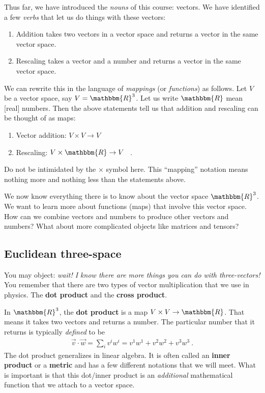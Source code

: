 \documentclass[12pt]{article}
\begin{document}
Thus far, we have introduced the \emph{nouns} of this course: vectors. We have identified a few \emph{verbs} that let us do things with these vectors:
\begin{enumerate}
    \item Addition takes two vectors in a vector space and returns a vector in the same vector space. 
    \item Rescaling takes a vector and a number and returns a vector in the same vector space.
\end{enumerate}
We can rewrite this in the language of \emph{mappings} (or \emph{functions}) as follows. Let $V$ be a vector space, say $V=\mathbbm{R}^3$. Let us write $\mathbbm{R}$ mean [real] numbers. Then the above statements tell us that addition and rescaling can be thought of as maps:
\begin{enumerate}
    \item Vector addition: $V\times V \to V$
    \item Rescaling: $V\times \mathbbm{R} \to V$ \ .
\end{enumerate}
Do not be intimidated by the $\times$ symbol here. This ``mapping'' notation means nothing more and nothing less than the statements above.

We now know everything there is to know about the vector space $\mathbbm{R}^3$. We want to learn more about functions (maps) that involve this vector space. How can we combine vectors and numbers to produce other vectors and numbers? What about more complicated objects like matrices and tensors? 


\subsection{Euclidean three-space}

You may object: \emph{wait! I know there are more things you can do with three-vectors!} You remember that there are two types of vector multiplication that we use in physics. The \textbf{dot product} and the \textbf{cross product}. 

In $\mathbbm{R}^3$, the \textbf{dot product} is a map $V\times V \to \mathbbm{R}$. That means it takes two vectors and returns a number. The particular number that it returns is typically \emph{defined} to be
\begin{align}
    \vec{v} \cdot \vec{w} 
    = \sum_i v^i w^i  
    = v^1w^1 + v^2 w^2 + v^3w^3 \ .
    \label{eq:euclidean:3d:metric:intro}
\end{align}
The dot product generalizes in linear algebra. It is often called an \textbf{inner product} or a \textbf{metric} and has a few different notations that we will meet. What is important is that this dot/inner product is an \emph{additional} mathematical function that we attach to a vector space. 
\end{document}
